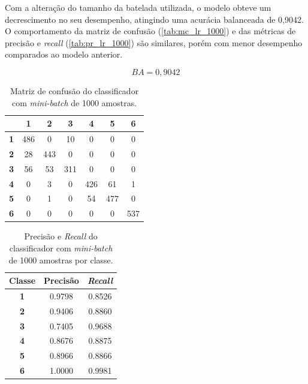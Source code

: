 Com a alteração do tamanho da batelada utilizada, o modelo obteve um decrescimento no seu desempenho, atingindo uma acurácia balanceada de 0,9042. O comportamento da matriz de confusão (\autoref{tab:mc_lr_1000}) e das métricas de precisão e \textit{recall} (\autoref{tab:pr_lr_1000}) são similares, porém com menor desempenho comparados ao modelo anterior.

\begin{equation}\label{eq:ba_lr_1000}
BA = 0,9042
\end{equation}

\begin{table}[H]
\centering
\begin{tabular}{c||c|c|c|c|c|c|}
	\cline{2-7}
	& \textbf{1} & \textbf{2} & \textbf{3} & \textbf{4} & \textbf{5} & \textbf{6} \\ \hline\hline
	\multicolumn{1}{|c||}{\textbf{1}} & 486        & 0          & 10         & 0          & 0          & 0          \\ \hline
	\multicolumn{1}{|c||}{\textbf{2}} & 28         & 443        & 0          & 0          & 0          & 0          \\ \hline
	\multicolumn{1}{|c||}{\textbf{3}} & 56         & 53         & 311        & 0          & 0          & 0          \\ \hline
	\multicolumn{1}{|c||}{\textbf{4}} & 0          & 3          & 0          & 426        & 61         & 1          \\ \hline
	\multicolumn{1}{|c||}{\textbf{5}} & 0          & 1          & 0          & 54         & 477        & 0          \\ \hline
	\multicolumn{1}{|c||}{\textbf{6}} & 0          & 0          & 0          & 0          & 0          & 537        \\ \hline
\end{tabular}
\caption{Matriz de confusão do classificador com \textit{mini-batch} de 1000 amostras.}
\label{tab:mc_lr_1000}
\end{table}

\begin{table}[H]
\centering
\begin{tabular}{c|c|c}
	\textbf{Classe} & \textbf{Precisão} & \textit{\textbf{Recall}} \\ \hline
	\textbf{1}      & 0.9798            & 0.8526                   \\
	\textbf{2}      & 0.9406            & 0.8860                   \\
	\textbf{3}      & 0.7405            & 0.9688                   \\
	\textbf{4}      & 0.8676            & 0.8875                   \\
	\textbf{5}      & 0.8966            & 0.8866                   \\
	\textbf{6}      & 1.0000            & 0.9981                  
\end{tabular}
\caption{Precisão e \textit{Recall} do classificador com \textit{mini-batch} de 1000 amostras por classe.}
\label{tab:pr_lr_1000}
\end{table}







